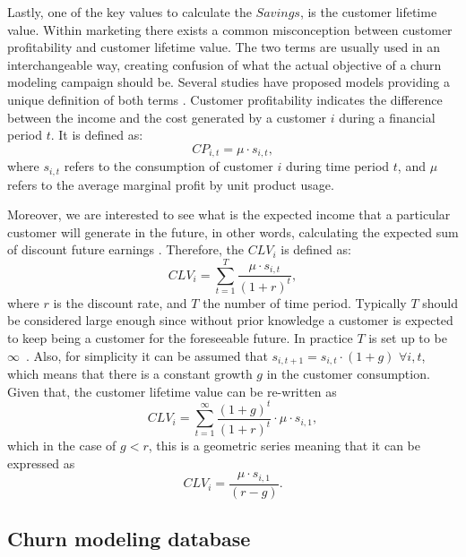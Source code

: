 Lastly, one of the key values to calculate the $Savings$, is the customer lifetime value. Within 
marketing there exists a common misconception between customer profitability and customer lifetime 
value. The two terms are usually used in an interchangeable way, 
creating confusion of what the actual objective of a churn modeling campaign should be. Several 
studies have proposed models providing a unique definition of both terms 
\citep{Neslin2006,Pfeifer2004,Milne1999a,VanRaaij2003}. Customer 
profitability indicates the difference between the income and the cost 
generated by a customer $i$ during a financial period $t$. It is defined as: 
\begin{equation}
	CP_{i,t} = \mu  \cdot s_{i,t},
\end{equation}
where  $s_{i,t}$ refers to the consumption of customer $i$ during time period $t$, and $\mu$ refers 
to the average marginal profit by unit product usage.  

Moreover, we are interested to see what is the expected income that a particular customer will 
generate in the future, in other words, calculating the expected sum of 
discount future earnings \citep{Neslin2006}. Therefore, the $CLV_i$ is defined as:
\begin{equation}
	CLV_i = \sum_{t=1}^T\frac{\mu \cdot s_{i,t}}{(1+r)^t},
\end{equation}
where $r$ is the discount rate, and $T$ the number of time period.
Typically $T$ should be considered large enough since without prior 
knowledge a customer is expected to keep being a customer for the foreseeable future. In practice 
$T$ is set up to be~$\infty$~\citep{Glady2009}. Also, for simplicity it can be assumed that 
$s_{i,t+1}=s_{i,t}\cdot (1+g)$ $\forall {i,t}$, which means that there is a constant growth $g$ in 
the customer consumption. Given that, the customer lifetime value can be re-written as
\begin{equation}
 CLV_i = \sum_{t=1}^\infty\frac{ (1+g)^t}{(1+r)^t}\cdot \mu\cdot s_{i,1},
\end{equation}
which in the case of $g<r$, this is a geometric series meaning that it can be expressed as
\begin{equation}
 CLV_i = \frac{\mu\cdot s_{i,1}}{(r-g)}.
\end{equation}


\subsection{Churn modeling database}
\label{sec:5:1:data}

